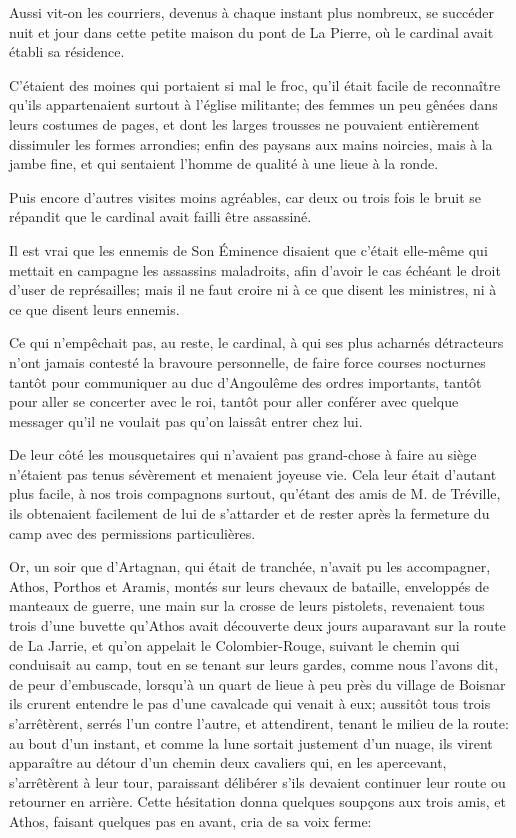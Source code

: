 Aussi vit-on les courriers, devenus à chaque instant plus nombreux, se succéder nuit et jour dans cette petite maison du pont de La Pierre, où le cardinal avait établi sa résidence. 

C'étaient des moines qui portaient si mal le froc, qu'il était facile de reconnaître qu'ils appartenaient surtout à l'église militante; des femmes un peu gênées dans leurs costumes de pages, et dont les larges trousses ne pouvaient entièrement dissimuler les formes arrondies; enfin des paysans aux mains noircies, mais à la jambe fine, et qui sentaient l'homme de qualité à une lieue à la ronde. 

Puis encore d'autres visites moins agréables, car deux ou trois fois le bruit se répandit que le cardinal avait failli être assassiné. 

Il est vrai que les ennemis de Son Éminence disaient que c'était elle-même qui mettait en campagne les assassins maladroits, afin d'avoir le cas échéant le droit d'user de représailles; mais il ne faut croire ni à ce que disent les ministres, ni à ce que disent leurs ennemis. 

Ce qui n'empêchait pas, au reste, le cardinal, à qui ses plus acharnés détracteurs n'ont jamais contesté la bravoure personnelle, de faire force courses nocturnes tantôt pour communiquer au duc d'Angoulême des ordres importants, tantôt pour aller se concerter avec le roi, tantôt pour aller conférer avec quelque messager qu'il ne voulait pas qu'on laissât entrer chez lui. 

De leur côté les mousquetaires qui n'avaient pas grand-chose à faire au siège n'étaient pas tenus sévèrement et menaient joyeuse vie. Cela leur était d'autant plus facile, à nos trois compagnons surtout, qu'étant des amis de M. de Tréville, ils obtenaient facilement de lui de s'attarder et de rester après la fermeture du camp avec des permissions particulières. 

Or, un soir que d'Artagnan, qui était de tranchée, n'avait pu les accompagner, Athos, Porthos et Aramis, montés sur leurs chevaux de bataille, enveloppés de manteaux de guerre, une main sur la crosse de leurs pistolets, revenaient tous trois d'une buvette qu'Athos avait découverte deux jours auparavant sur la route de La Jarrie, et qu'on appelait le Colombier-Rouge, suivant le chemin qui conduisait au camp, tout en se tenant sur leurs gardes, comme nous l'avons dit, de peur d'embuscade, lorsqu'à un quart de lieue à peu près du village de Boisnar ils crurent entendre le pas d'une cavalcade qui venait à eux; aussitôt tous trois s'arrêtèrent, serrés l'un contre l'autre, et attendirent, tenant le milieu de la route: au bout d'un instant, et comme la lune sortait justement d'un nuage, ils virent apparaître au détour d'un chemin deux cavaliers qui, en les apercevant, s'arrêtèrent à leur tour, paraissant délibérer s'ils devaient continuer leur route ou retourner en arrière. Cette hésitation donna quelques soupçons aux trois amis, et Athos, faisant quelques pas en avant, cria de sa voix ferme: 

